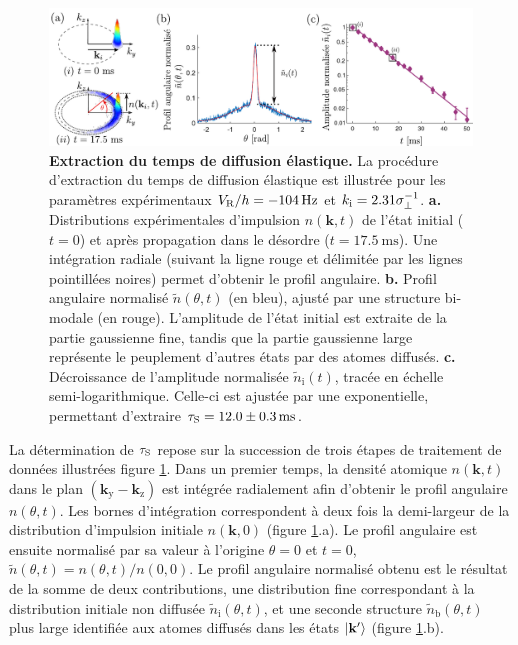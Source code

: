 \begin{figure}
\centering
\includegraphics[width=\textwidth]{Fig/TauS_PRL/extraction_taus.pdf}
\caption{\textbf{Extraction du temps de diffusion élastique.} La procédure d'extraction du temps de diffusion élastique est illustrée pour les paramètres expérimentaux $V_{\mathrm{R}}/h=\SI{-104}{\hertz}$ et $k_{\mathrm{i}}=2.31\sigma_{\perp}^{-1}$. \textbf{a.} Distributions expérimentales d'impulsion $n(\mathbf{k},t)$ de l'état initial ($t=0$) et après propagation dans le désordre ($t=\SI{17.5}{\milli\second}$). Une intégration radiale (suivant la ligne rouge et délimitée par les lignes pointillées noires) permet d'obtenir le profil angulaire. \textbf{b.} Profil angulaire normalisé $\tilde{n}(\theta,t)$ (en bleu), ajusté par une structure bi-modale (en rouge). L'amplitude de l'état initial est extraite de la partie gaussienne fine, tandis que la partie gaussienne large représente le peuplement d'autres états par des atomes diffusés. \textbf{c.} Décroissance de l'amplitude normalisée $\tilde{n}_{\mathrm{i}}(t)$, tracée en échelle semi-logarithmique. Celle-ci est ajustée par une exponentielle, permettant d'extraire $\tau_{\mathrm{S}}=12.0\pm\SI{0.3}{\milli\second}$.}
\label{fig:extraction_taus}
\end{figure}

La détermination de $\tau_{\mathrm{S}}$ repose sur la succession de trois étapes de traitement de données illustrées figure \ref{fig:extraction_taus}. Dans un premier temps, la densité atomique $n(\mathbf{k},t)$ dans le plan $(\mathbf{k}_{\mathrm{y}}-\mathbf{k}_{\mathrm{z}})$ est intégrée radialement afin d'obtenir le profil angulaire $n(\theta,t)$. Les bornes d'intégration correspondent  à deux fois la demi-largeur de la distribution d'impulsion initiale $n(\mathbf{k},0)$ (figure \ref{fig:extraction_taus}.a). Le profil angulaire est ensuite normalisé par sa valeur à l'origine $\theta=0$ et $t=0$, $\tilde{n}(\theta,t)= n(\theta,t)/n(0,0)$. Le profil angulaire normalisé obtenu est le résultat de la somme de deux contributions, une distribution fine correspondant à la distribution initiale non diffusée $\tilde{n}_{\mathrm{i}}(\theta,t)$, et une seconde structure $\tilde{n}_{\mathrm{b}}(\theta,t)$ plus large identifiée aux atomes diffusés dans les états $\left| \mathbf{k}' \right\rangle$ (figure \ref{fig:extraction_taus}.b). 

